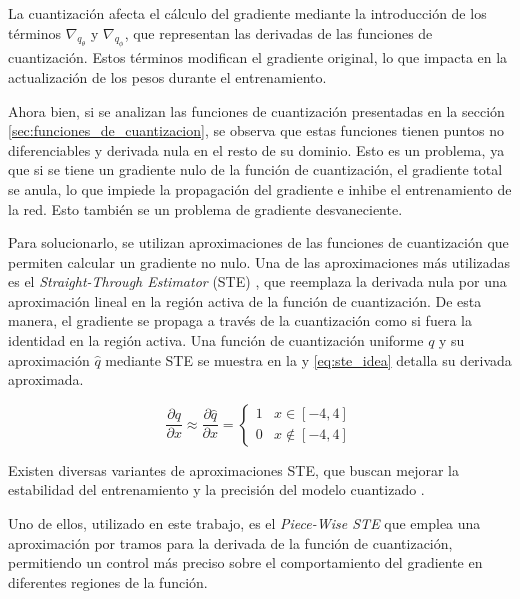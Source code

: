 La cuantización afecta el cálculo del gradiente mediante la introducción de los términos $\nabla_{q_{\theta}}$ y $\nabla_{q_{\phi}}$, que representan las derivadas de las funciones de cuantización. Estos términos modifican el gradiente original, lo que impacta en la actualización de los pesos durante el entrenamiento.

Ahora bien, si se analizan las funciones de cuantización presentadas en la sección \ref{sec:funciones_de_cuantizacion}, se observa que estas funciones tienen puntos no diferenciables y derivada nula en el resto de su dominio. Esto es un problema, ya que si se tiene un gradiente nulo de la función de cuantización, el gradiente total se anula, lo que impiede la propagación del gradiente e inhibe el entrenamiento de la red. Esto también se un problema de gradiente desvaneciente.

Para solucionarlo, se utilizan aproximaciones de las funciones de cuantización que permiten calcular un gradiente no nulo. Una de las aproximaciones más utilizadas es el \textit{Straight-Through Estimator} (STE) \cite{bengio2013estimatingpropagatinggradientsstochastic}, que reemplaza la derivada nula por una aproximación lineal en la región activa de la función de cuantización. De esta manera, el gradiente se propaga a través de la cuantización como si fuera la identidad en la región activa. Una función de cuantización uniforme $q$ y su aproximación $\hat{q}$ mediante STE se muestra en la  y \eqref{eq:ste_idea} detalla su derivada aproximada.


\begin{equation}
    \label{eq:ste_idea}
    \frac{\partial q}{\partial x} \approx
    \frac{\partial \hat{q}}{\partial x} =
    \begin{cases}
        1 & x \in [-4, 4] \\
        0 & x \notin [-4, 4]
    \end{cases}
\end{equation}

Existen diversas variantes de aproximaciones STE, que buscan mejorar la estabilidad del entrenamiento y la precisión del modelo cuantizado \cite{schoenbauer2024customgradientestimatorsstraightthrough}.

Uno de ellos, utilizado en este trabajo, es el \textit{Piece-Wise STE} \cite{jeong2025discretenessfinitesampleanalysisstraightthrough} que emplea una aproximación por tramos para la derivada de la función de cuantización, permitiendo un control más preciso sobre el comportamiento del gradiente en diferentes regiones de la función.


